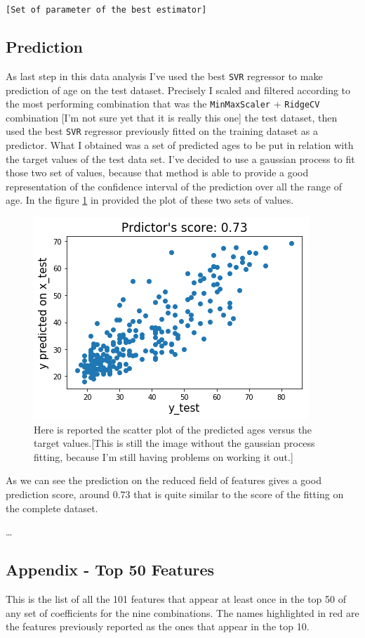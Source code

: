 \documentclass[11pt,a4paper]{report}
\begin{document}
\texttt{[Set of parameter of the best estimator]}


\subsection*{Prediction}
As last step in this data analysis I've used the best \texttt{SVR} regressor to make prediction of age on the test dataset.
Precisely I scaled and filtered according to the most performing combination that was the \texttt{MinMaxScaler} + \texttt{RidgeCV} combination [I'm not sure yet that it is really this one] the test dataset, then used the best \texttt{SVR} regressor previously fitted on the training dataset as a predictor. What I obtained was a set of predicted ages to be put in relation with the target values of the test data set.
I've decided to use a gaussian process to fit those two set of values, because that method is able to provide a good representation of the confidence interval of the prediction over all the range of age. In the figure \ref{fig:SVR_fit} in provided the plot of these two sets of values.

\begin{figure}[H]
  \begin{center}
  \includegraphics[width=0.5\linewidth]{After_train_SVR.png}
  \caption{\small{Here is reported the scatter plot of the predicted ages versus the target values.[This is still the image without the gaussian process fitting, because I'm still having problems on working it out.]}}
  \label{fig:SVR_fit}
  \end{center}
\end{figure}

As we can see the prediction on the reduced field of features gives a good prediction score, around 0.73 that is quite similar to the score of the fitting on the complete dataset.

\dots


\subsection*{Appendix - Top 50 Features}
This is the list of all the 101 features that appear at least once in the top 50 of any set of coefficients for the nine combinations. The names highlighted in red are the features previously reported as the ones that appear in the top 10.
\end{document}
